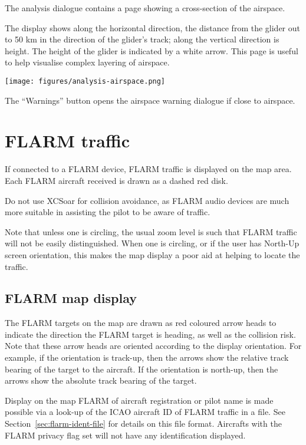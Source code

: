 The analysis dialogue contains a page showing a cross-section of the
airspace. 

The display shows along the horizontal direction, the
distance from the glider out to 50 km in the direction of the glider's
track; along the vertical direction is height.  The height of the
glider is indicated by a white arrow.  This page is useful to help
visualise complex layering of airspace.

\begin{center}
\texttt{[image: figures/analysis-airspace.png]}
\end{center}

The ``Warnings'' button opens the airspace warning dialogue if close to
airspace.

\section{FLARM traffic}

If connected to a FLARM device, FLARM traffic is displayed on the map
area.  Each FLARM aircraft received is drawn as a dashed red disk.

\warning Do not use XCSoar for collision avoidance, as
FLARM audio devices are much more suitable in assisting the pilot to be
aware of traffic.

Note that unless one is circling, the usual zoom level is such that
FLARM traffic will not be easily distinguished.  When one is circling,
or if the user has North-Up screen orientation, this makes the map display 
a poor aid at helping to locate the traffic.

\subsection*{FLARM map display}

The FLARM targets on the map are drawn as red coloured 
arrow heads to indicate the direction the FLARM target is
heading, as well as the collision risk.  Note that these
arrow heads are oriented according to the display orientation.  For example, if 
the orientation is track-up, then the arrows show the relative track bearing of
the target to the aircraft.  If the orientation is north-up, then the arrows show the
absolute track bearing of the target.

Display on the map FLARM of aircraft registration or pilot name is
made possible via a look-up of the ICAO aircraft ID of FLARM traffic
in a file.  See Section~\ref{sec:flarm-ident-file} for details on this
file format.  Aircrafts with the FLARM privacy flag set will not have
any identification displayed.


